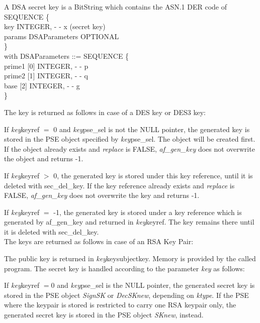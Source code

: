     A DSA secret key is a BitString
    which contains the ASN.1 DER code of
    \bvtab
    \4  SEQUENCE \{ \\
    \4  \2       key INTEGER, - - x (secret key)   \\
    \4  \2       params DSAParameters OPTIONAL  \\
    \4  \} \\
    \evtab
    with
    \bvtab
    DSAParameters ::= SEQUENCE \{ \\
    \4  \2       prime1 [0] INTEGER, - - p \\
    \4  \2       prime2 [1] INTEGER, - - q \\
    \4  \2       base [2] INTEGER, - - g \\
    \4  \} \\
    \evtab

\ei

The key is returned as follows in case of a DES key or DES3 key:

If {\em key}\pf keyref $=$ 0 and {\em key}\pf pse\_sel is not the NULL pointer, the generated key
is stored in the PSE object specified by {\em key}\pf pse\_sel. The object will be
created first. 
If the object already exists and {\em replace} is FALSE, {\em af\_gen\_key}
does not overwrite the object and returns -1.
 
If {\em key}\pf keyref $>$ 0, the generated key is stored under this key reference, until it is
deleted with sec\_del\_key. 
If the key reference already exists and {\em replace} is FALSE, {\em af\_gen\_key}
does not overwrite the key and returns -1.
 
If {\em key}\pf keyref $=$ -1, the generated key is stored under a key reference which is generated 
by af\_gen\_key and returned in {\em key}\pf keyref. The key remains there until it is deleted
with sec\_del\_key. \\ [0.5cm]
The keys are returned as follows in case of an RSA Key Pair:

The public key is returned in {\em key}\pf key\pf subjectkey. Memory is provided by the called program.
The secret key is handled according to the parameter {\em key} as follows: 

If {\em key}\pf keyref $= 0$ and {\em key}\pf pse\_sel is the NULL pointer, the
generated secret key is stored in the PSE object {\em SignSK} or
{\em DecSKnew}, depending on {\em ktype}. 
If the PSE where the keypair is stored is restricted to carry one RSA keypair only, 
the generated secret key is stored in the PSE object {\em SKnew}, instead.

